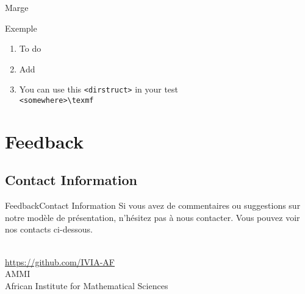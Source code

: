 \documentclass[10pt]{beamer}
\newcommand{\chref}[2]{%
  \href{#1}{{\usebeamercolor[bg]{Namkeen}#2}}%
}
\begin{document}
{
\begin{frame}{Marge }{}
  \begin{block}{Exemple}
    \begin{enumerate}
      \item To do 
      \item Add 
      \item You can use this {\tt <dirstruct>} in your test\\
    {\tt <somewhere>\textbackslash texmf}\\
    \end{enumerate}
  \end{block}
\end{frame}}
\section{Feedback}
\subsection{Contact Information}
{
\begin{frame}{Feedback}{Contact Information}
Si vous avez de commentaires ou suggestions sur notre mod\`ele de pr\'esentation, n'h\'esitez pas \`a nous contacter. Vous pouvez voir nos contacts ci-dessous.
  \begin{center}
    \insertauthor\\
    \chref{https://github.com/IVIA-AF}{https://github.com/IVIA-AF}\\
    AMMI\\
    African Institute for Mathematical Sciences
  \end{center}
\end{frame}}

{%
\begin{frame}%
\end{frame}}
\end{document}
